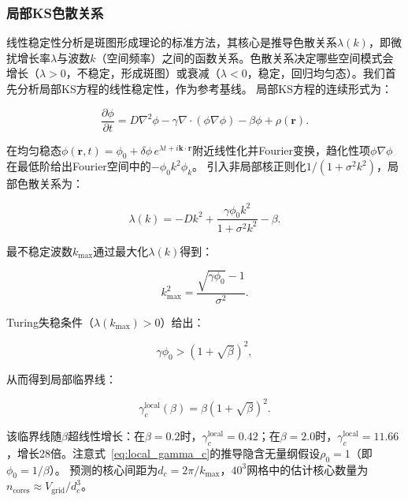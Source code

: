 \documentclass[sn-nature,pdflatex]{sn-jnl}
\begin{document}
\subsubsection{局部KS色散关系}

线性稳定性分析是斑图形成理论的标准方法，其核心是推导色散关系$\lambda(k)$，即微扰增长率$\lambda$与波数$k$（空间频率）之间的函数关系。色散关系决定哪些空间模式会增长（$\lambda > 0$，不稳定，形成斑图）或衰减（$\lambda < 0$，稳定，回归均匀态）。我们首先分析局部KS方程的线性稳定性，作为参考基线。
局部KS方程的连续形式为：

\begin{equation}
\frac{\partial \phi}{\partial t} = D \nabla^2 \phi - \gamma \nabla \cdot (\phi \nabla \phi) - \beta \phi + \rho(\mathbf{r}).
\end{equation}

在均匀稳态$\phi(\mathbf{r},t) = \phi_0 + \delta\phi \, e^{\lambda t + i\mathbf{k}\cdot\mathbf{r}}$附近线性化并Fourier变换，趋化性项$\phi \nabla \phi$在最低阶给出Fourier空间中的$-\phi_0 k^2 \phi_k$。
引入非局部核正则化$1/(1 + \sigma^2 k^2)$，局部色散关系为：

\begin{equation}
\label{eq:local_dispersion}
\lambda(k) = -D k^2 + \frac{\gamma \phi_0 k^2}{1 + \sigma^2 k^2} - \beta.
\end{equation}

最不稳定波数$k_{\max}$通过最大化$\lambda(k)$得到：

\begin{equation}
k_{\max}^2 = \frac{\sqrt{\gamma \phi_0} - 1}{\sigma^2}.
\end{equation}

Turing失稳条件（$\lambda(k_{\max}) > 0$）给出：

\begin{equation}
\label{eq:turing_condition}
\gamma \phi_0 > (1 + \sqrt{\beta})^2,
\end{equation}

从而得到局部临界线：

\begin{equation}
\label{eq:local_gamma_c}
\gamma_c^{\text{local}}(\beta) = \beta (1 + \sqrt{\beta})^2.
\end{equation}

该临界线随$\beta$超线性增长：在$\beta = 0.2$时，$\gamma_c^{\text{local}} = 0.42$；在$\beta = 2.0$时，$\gamma_c^{\text{local}} = 11.66$，增长28倍。注意式~\eqref{eq:local_gamma_c}的推导隐含无量纲假设$\rho_0 = 1$（即$\phi_0 = 1/\beta$）。
预测的核心间距为$d_c = 2\pi/k_{\max}$，$40^3$网格中的估计核心数量为$n_{\text{cores}} \approx V_{\text{grid}} / d_c^3$。
\end{document}
